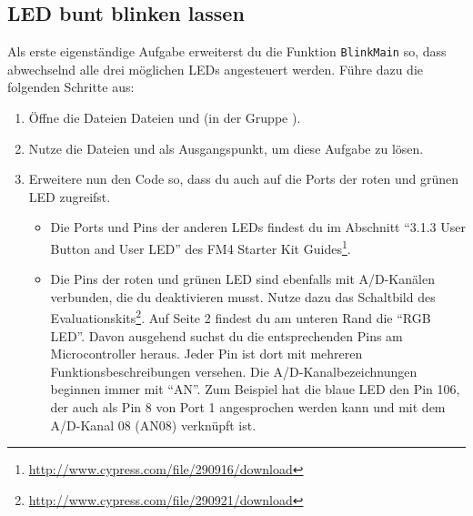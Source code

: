 \subsection{LED bunt blinken lassen}
Als erste eigenständige Aufgabe erweiterst du die Funktion \lstinline|BlinkMain| so, dass abwechselnd alle drei möglichen LEDs angesteuert werden.
Führe dazu die folgenden Schritte aus:
\begin{enumerate}
\item 
Öffne die Dateien Dateien  und  (in der Gruppe ).

\item 
Nutze die Dateien  und  als Ausgangspunkt, um diese Aufgabe zu lösen.

\item
Erweitere nun den Code so, dass du auch auf die Ports der roten und grünen LED zugreifst.
\begin{itemize}
\item 
Die Ports und Pins der anderen LEDs findest du \unteranderem im Abschnitt \enquote{3.1.3 User Button and User LED} des FM4 Starter Kit Guides\footnote{\url{http://www.cypress.com/file/290916/download}}.

\item 
Die Pins der roten und grünen LED sind ebenfalls mit A/D-Kanälen verbunden, die du deaktivieren musst.
Nutze dazu das Schaltbild des Evaluationskits\footnote{\url{http://www.cypress.com/file/290921/download}}.
Auf Seite 2 findest du am unteren Rand die \enquote{RGB LED}.
Davon ausgehend suchst du die entsprechenden Pins am Microcontroller heraus.
Jeder Pin ist dort mit mehreren Funktionsbeschreibungen versehen.
Die A/D-Kanalbezeichnungen beginnen immer mit \enquote{AN}.
Zum Beispiel hat die blaue LED den Pin 106, der auch als Pin 8 von Port 1 angesprochen werden kann und mit dem A/D-Kanal 08 (AN08) verknüpft ist.
\end{itemize}
\end{enumerate}

